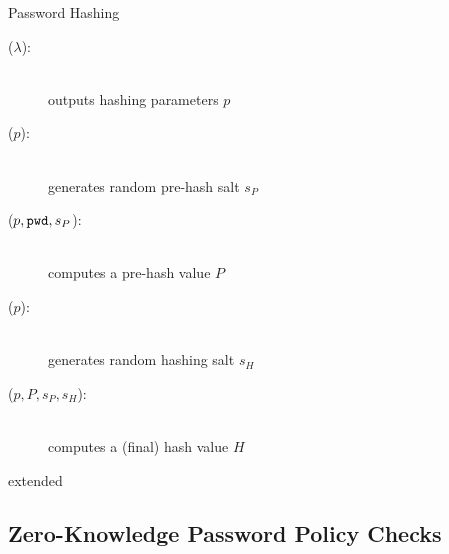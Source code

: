 \documentclass[notes,xcolor=dvipsnames]{beamer}
\begin{document}
\begin{frame}{Password Hashing}
  \begin{center}
  \end{center}
  \begin{description}
    \item[\PSetup($\lambda$):] \hfill\\ outputs hashing parameters $p$
    \item[\PPHSalt($p$):] \hfill\\	generates random pre-hash salt $s_P$
    \item[\PPreHash($p, \mathtt{pwd}, s_P$):] \hfill\\	computes a pre-hash value $P$
    \item[\PHSalt($p$):] \hfill\\ generates random hashing salt $s_H$
    \item[\PHash($p, P, s_P, s_H$):]	\hfill\\ computes a (final) hash value $H$
  \end{description}
  extended \cite{BenhamoudaP13}
\end{frame}

\subsection[ZKPPC]{Zero-Knowledge Password Policy Checks}
\end{document}
